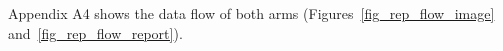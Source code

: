 Appendix A4 shows the data flow of both arms (Figures~\ref{fig_rep_flow_image} and~\ref{fig_rep_flow_report}).\par
